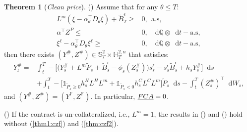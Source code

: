 \documentclass[a4paper, 11pt]{article}              %
\numberwithin{equation}{section}
\theoremstyle{plain}
\newcommand{\dqdt}{\df \dsQ \otimes \df t-\text{a.s}}
\newcommand{\1}{\mathds{1}}
\newcommand{\Bt}{\tilde{B}}
\newcommand{\pt}{\tilde{P}}
\newcommand{\dsF}{\mathbb{F}}
\newcommand{\dsH}{\mathbb{H}}
\newcommand{\dsQ}{\mathbb{Q}}
\newcommand{\dsS}{\mathbb{S}}
\theoremstyle{plain}
\newtheorem{theorem}[thm]{Theorem}
\theoremstyle{definition}
\newtheorem{theorem}{Theorem}
\theoremstyle{plain}
\newcommand*\df{\mathop{}\!\mathrm{d}}
\newcommand{\rom}[1]{\lowercase\expandafter{\romannumeral #1\relax}}
\begin{document}
\begin{theorem}[\textit{Clean price}]
(\rom{2}) Assume that for any $\theta \leq T$:
\begin{align}
    L^m(\xi - \alpha_\theta^\top D_\theta\xi) +\Bt^\epsilon_T \geq&0,~~\text{a.s,}\label{thm:cx}\\
  \alpha^\top Z^P \leq&0, ~~\dqdt,   \label{thm:czf2}\\
  \xi^\ell - \alpha_\theta^\top D_\theta\xi^\ell \geq&0,~~\dqdt, \label{thm:cxl}
\end{align}
then there exists $(Y^\#, Z^\#) \in \dsS^2_T \times\dsH^{2, n}_T$ that satisfies:
\begin{align}
  Y^\#_t =& \int_{t}^{T} -\bigg[\Big(Y^\#_s +L^m\pt_s+\Bt^\epsilon_s-\phi_s(Z^\#_s)\Big)s^{\ell}_s-s^\epsilon_s\Bt^\epsilon_s+h_sY^\#_s\bigg]\df s\nonumber\\
  &+\int_{t}^{T}
    -\big[\1_{\pt_s\geq0}h^H_sL^HL^m+\1_{\pt_s<0}h^C_sL^CL^m\big]\pt_s\df s
    -\int_{t}^{T}(Z^\#_s)^\top\df W_s, \nonumber 
\end{align}
and $(Y^\#, Z^\#) = (Y^\dsF, Z^\dsF)$. In particular, $\emph{FCA}=0$.

(\rom{3}) If the contract is un-collateralized, i.e., $L^m = 1$, the results 
in (\rom{1}) and  (\rom{2}) hold without (\ref{thm1:czf}) and (\ref{thm:czf2}).
\iffalse
(\rom{4}) Assume full collateralization, i.e., $L^m=0$. Then $h^i$, $i \in \{H,
C\}$ do  not need to be deterministic, and   (\ref{thm1:czf})
and (\ref{thm:czf2}) are not required. Instead, in (\rom{1}), we need
\begin{align}
  \alpha_\theta^\top (D_\theta h_t) \xi \geq0,\nonumber 
\end{align}
and in (\rom{2}), we need $\alpha_\theta^\top (D_\theta h_t) \xi \leq0$ for any $\theta \leq t$.
\fi
\end{theorem}
\end{document}
